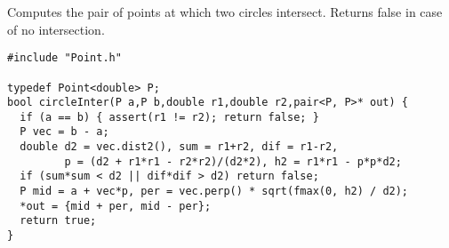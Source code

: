 Computes the pair of points at which two circles intersect. Returns false in case of no intersection.
\begin{verbatim}
#include "Point.h"

typedef Point<double> P;
bool circleInter(P a,P b,double r1,double r2,pair<P, P>* out) {
  if (a == b) { assert(r1 != r2); return false; }
  P vec = b - a;
  double d2 = vec.dist2(), sum = r1+r2, dif = r1-r2,
         p = (d2 + r1*r1 - r2*r2)/(d2*2), h2 = r1*r1 - p*p*d2;
  if (sum*sum < d2 || dif*dif > d2) return false;
  P mid = a + vec*p, per = vec.perp() * sqrt(fmax(0, h2) / d2);
  *out = {mid + per, mid - per};
  return true;
}
\end{verbatim}